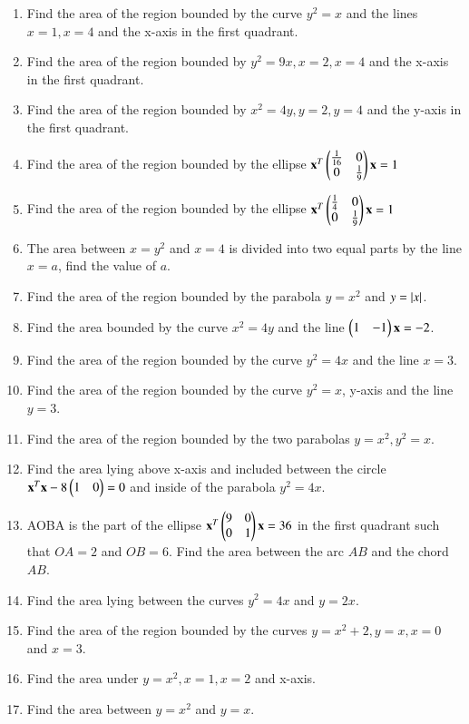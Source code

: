 \begin{enumerate}[label=\thesection.\arabic*.,ref=\thesection.\theenumi]
%
\item Find the area of the region bounded by the curve $y^2= x$ and the lines $x = 1, x = 4$ and the x-axis in the first quadrant.
\item  Find the area of the region bounded by $y^2=9x, x=2, x=4$ and the x-axis in the  first quadrant.
%
\item Find the area of the region bounded by $x^2 = 4y, y = 2, y = 4$ and the y-axis in the first quadrant.
\item Find the area of the region bounded by the ellipse 
$
\mathbf{x}^T\begin{pmatrix}\frac{1}{16} & 0 \\ 0 & \frac{1}{9}\end{pmatrix}\mathbf{x} = 1
$

\item  Find the area of the region bounded by the ellipse 
$
\mathbf{x}^T\begin{pmatrix}\frac{1}{4} & 0 \\ 0 & \frac{1}{9}\end{pmatrix}\mathbf{x} = 1
$
\item The area between $x=y^2$ and $x=4$ is divided into two equal parts by the line $x=a$, find the value of $a$.
\item  Find the area of the region bounded by the parabola $y = x^2$ and $y = \left\vert x\right\vert$.
\item  Find the area bounded by the curve $x^2 = 4y$ and the line $\begin{pmatrix}1 & -1\end{pmatrix}\mathbf{x} = -2$.
\item  Find the area of the region bounded by the curve $y^2 = 4x$ and the line $x = 3$.
%
\item Find the area of the region bounded by the curve $y^2 = x$, y-axis and the line $y = 3$.
%
\item Find the area of the region bounded by the two parabolas $y = x^2, y^2=x$.
\item Find the area lying above x-axis and included between the circle $\mathbf{x}^T\mathbf{x} -8\begin{pmatrix}1 & 0\end{pmatrix}= 0$  and inside of the parabola $y^2 = 4x$.
%
\item AOBA is the part of the ellipse 
$
\mathbf{x}^T\begin{pmatrix}9 & 0 \\ 0 & 1\end{pmatrix}\mathbf{x} = 36
$
in the first quadrant such that $OA = 2$ and $OB = 6$. Find the area between the arc $AB$ and the chord $AB$.
\item Find the area lying between the curves $y^2 = 4x$ and $y = 2x$.
\item  Find the area of the region bounded by the curves $y = x^2+2, y = x, x = 0$ and $ x = 3.$
%
\item Find the area under $y = x^2, x = 1, x = 2$ and x-axis.
\item Find the area between  $y = x^2$ and $y = x$.

\end{enumerate}
